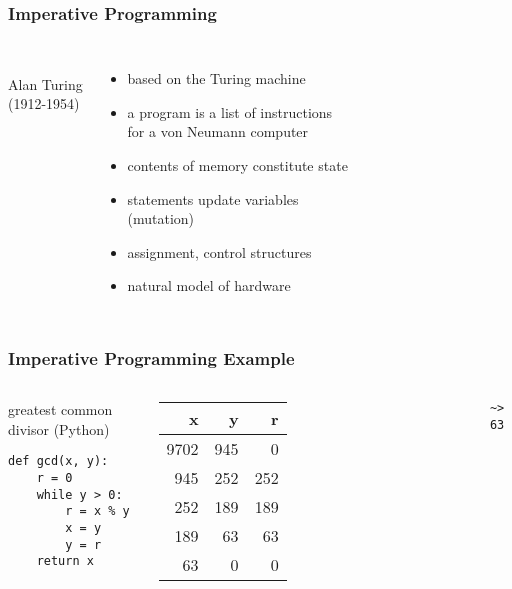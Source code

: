 \documentclass[dvipsnames]{beamer}
\theoremstyle{plain}
\begin{document}
\begin{frame}
  \frametitle{Imperative Programming}

  \begin{columns}
    \begin{center}
      \\
      Alan Turing\\
      (1912-1954)
    \end{center}

    \begin{itemize}
      \item based on the Turing machine
      \item a program is a list of instructions\\
        for a von Neumann computer
      \item contents of memory constitute \alert{state}
      \item statements update variables\\
        (\alert{mutation})
      \item assignment, control structures
      \item natural model of hardware
    \end{itemize}
  \end{columns}
\end{frame}

\begin{frame}[fragile]
  \frametitle{Imperative Programming Example}

  \begin{columns}[b]
    \begin{exampleblock}{greatest common divisor (Python)}
      \begin{lstlisting}
def gcd(x, y):
    r = 0
    while y > 0:
        r = x % y
        x = y
        y = r
    return x
      \end{lstlisting}
    \end{exampleblock}

    \begin{tabular}{|r|r|r|}\hline
   x &   y &   r\\\hline\hline
9702 & 945 &   0\\\hline
 945 & 252 & 252\\\hline
 252 & 189 & 189\\\hline
 189 &  63 &  63\\\hline
  63 &   0 &   0\\\hline
    \end{tabular}

    \medskip
    \lstinline|~> 63|
  \end{columns}
\end{frame}
\end{document}
